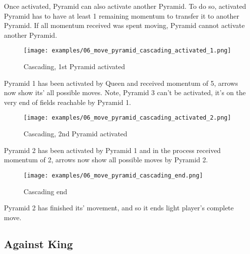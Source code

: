 Once activated, Pyramid can also activate another Pyramid. To do so, activated
Pyramid has to have at least 1 remaining momentum to transfer it to another
Pyramid. If all momentum received was spent moving, Pyramid cannot activate
another Pyramid.

\clearpage %

\noindent
\begin{figure}[!h]
\texttt{[image: examples/06\_move\_pyramid\_cascading\_activated\_1.png]}
\caption{Cascading, 1st Pyramid activated}
\label{fig:06_move_pyramid_cascading_activated_1}
\end{figure}

Pyramid 1 has been activated by Queen and received momentum of 5, arrows now show
its' all possible moves. Note, Pyramid 3 can't be activated, it's on the very end
of fields reachable by Pyramid 1.

\clearpage %

\noindent
\begin{figure}[!h]
\texttt{[image: examples/06\_move\_pyramid\_cascading\_activated\_2.png]}
\caption{Cascading, 2nd Pyramid activated}
\label{fig:06_move_pyramid_cascading_activated_2}
\end{figure}

Pyramid 2 has been activated by Pyramid 1 and in the process received momentum of 2,
arrows now show all possible moves by Pyramid 2.

\clearpage %

\noindent
\begin{figure}[!h]
\texttt{[image: examples/06\_move\_pyramid\_cascading\_end.png]}
\caption{Cascading end}
\label{fig:06_move_pyramid_cascading_end}
\end{figure}

Pyramid 2 has finished its' movement, and so it ends light player's complete move.

\clearpage %

\subsection*{Against King}

